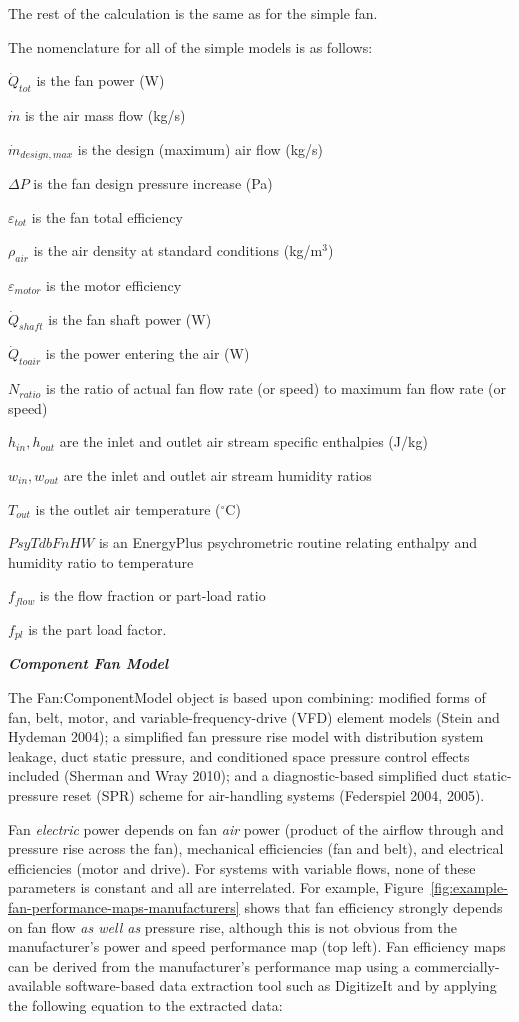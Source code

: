 The rest of the calculation is the same as for the simple fan.

The nomenclature for all of the simple models is as follows:

\({\dot Q_{tot}}\) is the fan power (W)

\(\dot m\) is the air mass flow (kg/s)

\({\dot m_{design,max}}\) is the design (maximum) air flow (kg/s)

\(\Delta P\) is the fan design pressure increase (Pa)

\({\varepsilon_{tot}}\) is the fan total efficiency

\({\rho_{air}}\) is the air density at standard conditions (kg/m\(^{3}\))

\({\varepsilon_{motor}}\) is the motor efficiency

\({\dot Q_{shaft}}\) is the fan shaft power (W)

\({\dot Q_{toair}}\) is the power entering the air (W)

\({N_{ratio}}\) is the ratio of actual fan flow rate (or speed) to maximum fan flow rate (or speed)

\({h_{in}},{h_{out}}\) are the inlet and outlet air stream specific enthalpies (J/kg)

\({w_{in}},{w_{out}}\) are the inlet and outlet air stream humidity ratios

\({T_{out}}\) is the outlet air temperature (\(^{\circ}\)C)

\(PsyTdbFnHW\) is an EnergyPlus psychrometric routine relating enthalpy and humidity ratio to temperature

\({f_{flow}}\) is the flow fraction or part-load ratio

\({f_{pl}}\) is the part load factor.

\emph{\textbf{Component Fan Model}}

The Fan:ComponentModel object is based upon combining: modified forms of fan, belt, motor, and variable-frequency-drive (VFD) element models (Stein and Hydeman 2004); a simplified fan pressure rise model with distribution system leakage, duct static pressure, and conditioned space pressure control effects included (Sherman and Wray 2010); and a diagnostic-based simplified duct static-pressure reset (SPR) scheme for air-handling systems (Federspiel 2004, 2005).

Fan \emph{electric} power depends on fan \emph{air} power (product of the airflow through and pressure rise across the fan), mechanical efficiencies (fan and belt), and electrical efficiencies (motor and drive). For systems with variable flows, none of these parameters is constant and all are interrelated. For example, Figure~\ref{fig:example-fan-performance-maps-manufacturers} shows that fan efficiency strongly depends on fan flow \emph{as well as} pressure rise, although this is not obvious from the manufacturer's power and speed performance map (top left). Fan efficiency maps can be derived from the manufacturer's performance map using a commercially-available software-based data extraction tool such as DigitizeIt and by applying the following equation to the extracted data:

